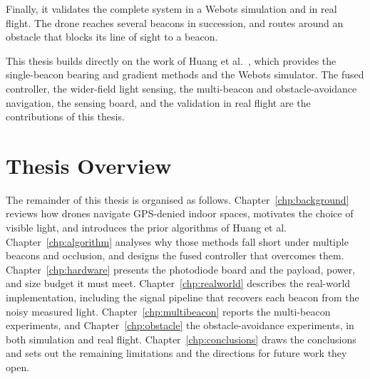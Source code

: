 Finally, it validates the complete system in a Webots simulation and in real flight. The drone reaches several beacons in succession, and routes around an obstacle that blocks its line of sight to a beacon.

This thesis builds directly on the work of Huang et al.~\cite{huang2026lta}, which provides the single-beacon bearing and gradient methods and the Webots simulator. The fused controller, the wider-field light sensing, the multi-beacon and obstacle-avoidance navigation, the sensing board, and the validation in real flight are the contributions of this thesis.

\section{Thesis Overview}

The remainder of this thesis is organised as follows. Chapter~\ref{chp:background} reviews how drones navigate GPS-denied indoor spaces, motivates the choice of visible light, and introduces the prior algorithms of Huang et al. Chapter~\ref{chp:algorithm} analyses why those methods fall short under multiple beacons and occlusion, and designs the fused controller that overcomes them. Chapter~\ref{chp:hardware} presents the photodiode board and the payload, power, and size budget it must meet. Chapter~\ref{chp:realworld} describes the real-world implementation, including the signal pipeline that recovers each beacon from the noisy measured light. Chapter~\ref{chp:multibeacon} reports the multi-beacon experiments, and Chapter~\ref{chp:obstacle} the obstacle-avoidance experiments, in both simulation and real flight. Chapter~\ref{chp:conclusions} draws the conclusions and sets out the remaining limitations and the directions for future work they open.
